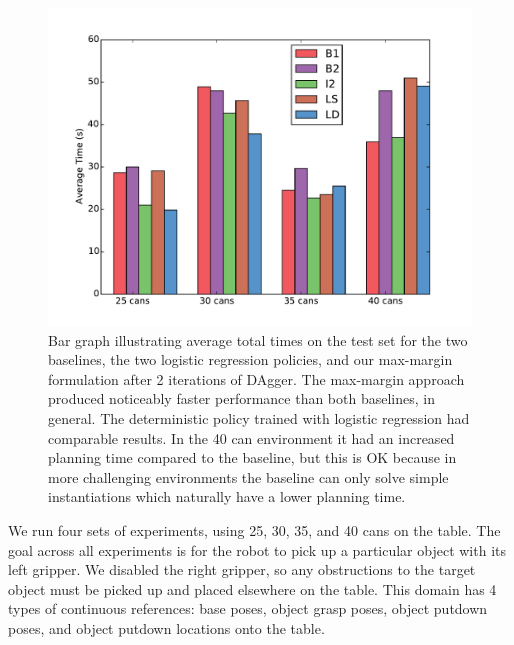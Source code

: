 \begin{figure}[h]
  \centering
    \includegraphics[scale=0.43]{images/results_bar_time}
  \caption{\small{Bar graph illustrating average total times on the test set for the
two baselines, the two logistic regression policies, and our max-margin formulation after 2 iterations of DAgger. The max-margin approach produced noticeably faster
performance than both baselines, in general. The deterministic policy trained with logistic regression had comparable results. In the 40 can environment it had an increased planning time compared to the baseline, but this is OK because in more challenging environments the baseline can only solve simple instantiations which naturally have a lower planning time.}}
  \label{fig:results_bar_time}
\end{figure}

We run four sets of experiments, using 25, 30, 35, and 40 cans on the table.
The goal across all experiments is for the robot to pick up a particular object with its
left gripper. We disabled the right gripper, so any obstructions to the target object must be picked up and
placed elsewhere on the table. This domain has 4 types of continuous references: base poses, object grasp
poses, object putdown poses, and object putdown locations onto the table.

